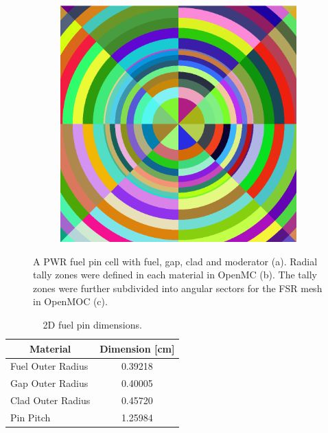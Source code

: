 \begin{figure}[H]
\begin{subfigure}{.32\textwidth}
  \caption{}
\end{subfigure}
\begin{subfigure}{.32\textwidth}
  \centering
  \includegraphics[width=0.9\linewidth]{figures/biases/pin-cell/pin-cell-8x8}
  \caption{}
\end{subfigure}
\caption[Pin cell materials and geometry]{A PWR fuel pin cell with fuel, gap, clad and moderator (a). Radial tally zones were defined in each material in OpenMC (b). The tally zones were further subdivided into angular sectors for the \ac{FSR} mesh in OpenMOC (c).}
\label{fig:chap4-pin-cell}
\end{figure}

\begin{table}[h!]
  \centering
  \caption{2D fuel pin dimensions.}
  \label{table:chap4-pin-dimensions} 
  \vspace{6pt}
  \begin{tabular}{l c}
  \toprule
  \multicolumn{1}{c}{\bf Material} &
  \multicolumn{1}{c}{\bf Dimension [cm]} \\
  \midrule
  Fuel Outer Radius &     0.39218 \\
  Gap Outer Radius &      0.40005 \\
  Clad Outer Radius &     0.45720 \\
  Pin Pitch &             1.25984 \\
  \bottomrule
\end{tabular}
\end{table}

